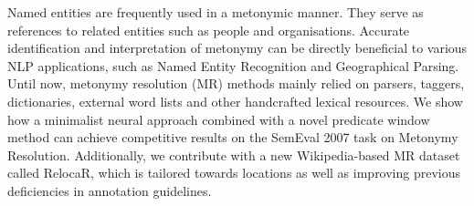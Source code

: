 Named entities are frequently used in a metonymic manner. They serve as references to related entities such as people and organisations. Accurate identification and interpretation of metonymy can be directly beneficial to various NLP applications, such as Named Entity Recognition and Geographical Parsing. Until now, metonymy resolution (MR) methods mainly relied on parsers, taggers, dictionaries, external word lists and other handcrafted lexical resources. We show how a minimalist neural approach combined with a novel predicate window method can achieve competitive results on the SemEval 2007 task on Metonymy Resolution. Additionally, we contribute with a new Wikipedia-based MR dataset called RelocaR, which is tailored towards locations as well as improving previous deficiencies in annotation guidelines.
